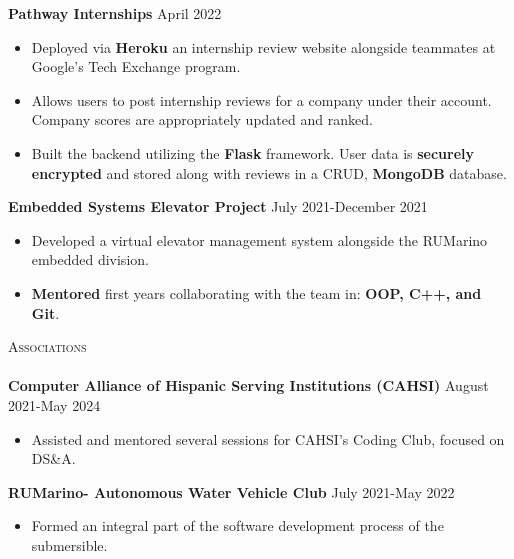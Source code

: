 \documentclass[a4paper]{article}
\newcommand{\lineunder} {
    \vspace*{-8pt} \\
    \hspace*{-18pt} \hrulefill \\
}
\newcommand{\header} [1] {
    {\hspace*{-18pt}\vspace*{6pt} \textsc{#1}}
    \vspace*{-6pt} \lineunder
}
\begin{document}
{\textbf{Pathway Internships}} \hfill April 2022 \\
\vspace{-2mm}
\begin{itemize} \itemsep -1pt
\item Deployed via \textbf{Heroku} an internship review website alongside teammates at Google's Tech Exchange program.

\item Allows users to post internship reviews for a company under their account. Company scores are appropriately updated and ranked.

\item Built the backend utilizing the \textbf{Flask} framework. User data is \textbf{securely encrypted} and stored along with reviews in a CRUD, \textbf{MongoDB} database. 
\end{itemize}

{\textbf{Embedded Systems Elevator Project}} \hfill \hfill July 2021-December 2021\\
\vspace{-2mm}

\begin{itemize} \itemsep -1pt
\item Developed a virtual elevator management system alongside the RUMarino embedded division.

\item \textbf{Mentored} first years collaborating with the team in: \textbf{OOP, C++, and Git}.
\end{itemize}
\vspace*{-0.5mm}

\header{Associations}

\vspace{-1mm} \textbf{Computer Alliance of Hispanic Serving Institutions (CAHSI)} \hfill August 2021-May 2024\\
\begin{itemize} \itemsep -1pt
\vspace{-2mm}
\item Assisted and mentored several sessions for CAHSI's Coding Club, focused on DS\&A. \\
\end{itemize}

\vspace{-1mm}
\textbf{RUMarino- Autonomous Water Vehicle Club} \hfill July 2021-May 2022 \\ 
\vspace{-2mm}
\begin{itemize} \itemsep -1pt
\item Formed an integral part of the software development process of the submersible. \\ 
\end{itemize}
 


\ 
\end{document}
